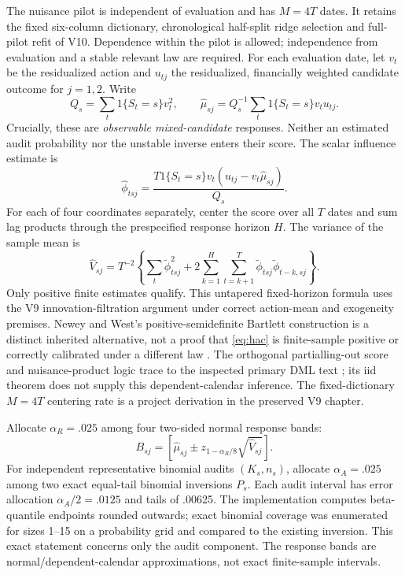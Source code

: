 \documentclass[11pt,a4paper]{article}
\begin{document}
The nuisance pilot is independent of evaluation and has $M=4T$ dates. It
retains the fixed six-column dictionary, chronological half-split ridge
selection and full-pilot refit of V10. Dependence within the pilot is allowed;
independence from evaluation and a stable relevant law are required. For each
evaluation date, let $v_t$ be the residualized action and $u_{tj}$ the
residualized, financially weighted candidate outcome for $j=1,2$. Write
\begin{equation}
 Q_s=\sum_t1\{S_t=s\}v_t^2,\qquad
 \widehat\mu_{sj}=Q_s^{-1}\sum_t1\{S_t=s\}v_tu_{tj}.
\end{equation}
Crucially, these are \emph{observable mixed-candidate} responses. Neither
an estimated audit probability nor the unstable inverse enters their score.
The scalar influence estimate is
\begin{equation}\label{eq:score}
 \widehat\phi_{tsj}=\frac{T1\{S_t=s\}v_t
 (u_{tj}-v_t\widehat\mu_{sj})}{Q_s}.
\end{equation}
For each of four coordinates separately, center the score over all $T$ dates
and sum lag products through the prespecified response horizon $H$. The
variance of the sample mean is
\begin{equation}\label{eq:hac}
 \widehat V_{sj}=T^{-2}\left\{\sum_t\widetilde\phi_{tsj}^2+
 2\sum_{k=1}^{H}\sum_{t=k+1}^{T}
 \widetilde\phi_{tsj}\widetilde\phi_{t-k,sj}\right\}.
\end{equation}
Only positive finite estimates qualify. This untapered fixed-horizon formula
uses the V9 innovation-filtration argument under correct action-mean and
exogeneity premises. Newey and West's positive-semidefinite Bartlett
construction is a distinct inherited alternative, not a proof that
\eqref{eq:hac} is finite-sample positive or correctly calibrated under a
different law \cite{newey1986}. The orthogonal partialling-out score and
nuisance-product logic trace to the inspected primary DML text
\cite{dml2018}; its iid theorem does not supply this dependent-calendar
inference. The fixed-dictionary $M=4T$ centering rate is a project derivation
in the preserved V9 chapter.

Allocate $\alpha_R=.025$ among four two-sided normal response bands:
\begin{equation}
 B_{sj}=\left[\widehat\mu_{sj}\pm
 z_{1-\alpha_R/8}\sqrt{\widehat V_{sj}}\right].
\end{equation}
For independent representative binomial audits $(K_s,n_s)$, allocate
$\alpha_A=.025$ among two exact equal-tail binomial inversions $P_s$. Each
audit interval has error allocation $\alpha_A/2=.0125$ and tails of .00625.
The implementation computes beta-quantile endpoints rounded outwards; exact
binomial coverage was enumerated for sizes 1--15 on a probability grid and
compared to the existing inversion. This exact statement concerns only the
audit component. The response bands are normal/dependent-calendar
approximations, not exact finite-sample intervals.
\end{document}
